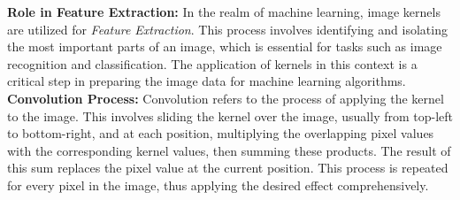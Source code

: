 \documentclass[unicode,11pt,a4paper,oneside,numbers=endperiod,openany]{scrartcl}
\begin{document}
\textbf{Role in Feature Extraction:}
In the realm of machine learning, image kernels are utilized for \textit{Feature Extraction}. This process involves identifying and isolating the most important parts of an image, which is essential for tasks such as image recognition and classification. The application of kernels in this context is a critical step in preparing the image data for machine learning algorithms.
\newline
\textbf{Convolution Process:}
Convolution refers to the process of applying the kernel to the image. This involves sliding the kernel over the image, usually from top-left to bottom-right, and at each position, multiplying the overlapping pixel values with the corresponding kernel values, then summing these products. The result of this sum replaces the pixel value at the current position. This process is repeated for every pixel in the image, thus applying the desired effect comprehensively.
\end{document}
